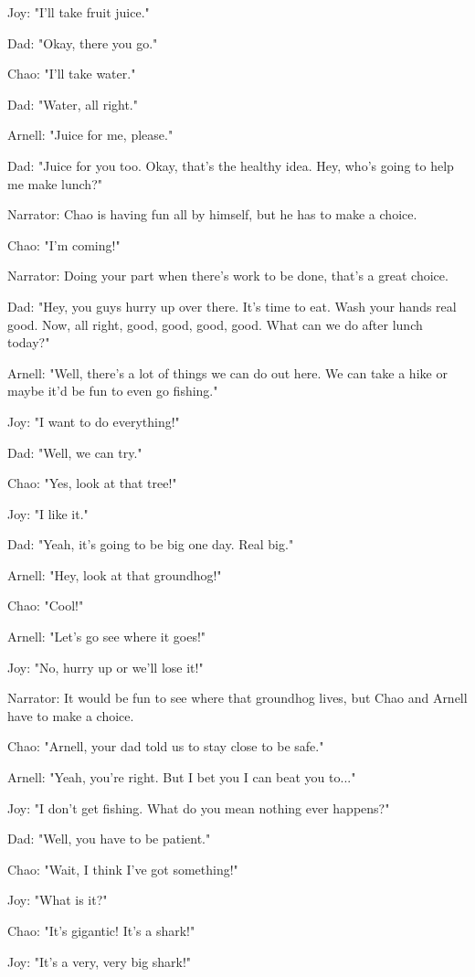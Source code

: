 Joy: "I'll take fruit juice."

Dad: "Okay, there you go."

Chao: "I'll take water."

Dad: "Water, all right."

Arnell: "Juice for me, please."

Dad: "Juice for you too. Okay, that's the healthy idea. Hey, who's going to help me make lunch?"

Narrator: Chao is having fun all by himself, but he has to make a choice.

Chao: "I'm coming!"

Narrator: Doing your part when there's work to be done, that's a great choice.

Dad: "Hey, you guys hurry up over there. It's time to eat. Wash your hands real good. Now, all right, good, good, good, good. What can we do after lunch today?"

Arnell: "Well, there's a lot of things we can do out here. We can take a hike or maybe it'd be fun to even go fishing."

Joy: "I want to do everything!"

Dad: "Well, we can try."

Chao: "Yes, look at that tree!"

Joy: "I like it."

Dad: "Yeah, it's going to be big one day. Real big."

Arnell: "Hey, look at that groundhog!"

Chao: "Cool!"

Arnell: "Let's go see where it goes!"

Joy: "No, hurry up or we'll lose it!"

Narrator: It would be fun to see where that groundhog lives, but Chao and Arnell have to make a choice.

Chao: "Arnell, your dad told us to stay close to be safe."

Arnell: "Yeah, you're right. But I bet you I can beat you to..."

Joy: "I don't get fishing. What do you mean nothing ever happens?"

Dad: "Well, you have to be patient."

Chao: "Wait, I think I've got something!"

Joy: "What is it?"

Chao: "It's gigantic! It's a shark!"

Joy: "It's a very, very big shark!"

